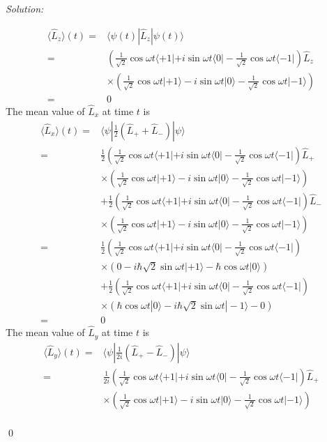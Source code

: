\documentclass[12pt,a4paper]{article}
\newenvironment{sol}
    {\emph{Solution:}
    }
    {
    \qed
    }
\begin{document}
\begin{sol}
\begin{itemize}
\begin{align}
\nonumber\langle\hat{L}_z\rangle(t)=&\langle\psi(t)|\hat{L}_z|\psi(t)\rangle\\
\nonumber=&(\frac{1}{\sqrt{2}}\cos\omega t\langle+1|+i\sin\omega t\langle0|-\frac{1}{\sqrt{2}}\cos\omega t\langle-1|)\hat{L}_z\\
\nonumber&\times(\frac{1}{\sqrt{2}}\cos\omega t|+1\rangle-i\sin\omega t|0\rangle-\frac{1}{\sqrt{2}}\cos\omega t|-1\rangle)\\
=&0
\end{align}
The mean value of $\hat{L}_x$ at time $t$ is
\begin{align}
\nonumber\langle\hat{L}_x\rangle(t)=&\langle\psi|\frac{1}{2}(\hat{L}_++\hat{L}_-)|\psi\rangle\\
\nonumber=&\frac{1}{2}(\frac{1}{\sqrt{2}}\cos\omega t\langle+1|+i\sin\omega t\langle0|-\frac{1}{\sqrt{2}}\cos\omega t\langle-1|)\hat{L}_+\\
\nonumber&\times(\frac{1}{\sqrt{2}}\cos\omega t|+1\rangle-i\sin\omega t|0\rangle-\frac{1}{\sqrt{2}}\cos\omega t|-1\rangle)\\
\nonumber&+\frac{1}{2}(\frac{1}{\sqrt{2}}\cos\omega t\langle+1|+i\sin\omega t\langle0|-\frac{1}{\sqrt{2}}\cos\omega t\langle-1|)\hat{L}_-\\
\nonumber&\times(\frac{1}{\sqrt{2}}\cos\omega t|+1\rangle-i\sin\omega t|0\rangle-\frac{1}{\sqrt{2}}\cos\omega t|-1\rangle)\\
\nonumber=&\frac{1}{2}(\frac{1}{\sqrt{2}}\cos\omega t\langle+1|+i\sin\omega t\langle0|-\frac{1}{\sqrt{2}}\cos\omega t\langle-1|)\\
\nonumber&\times(0-i\hbar\sqrt{2}\sin\omega t|+1\rangle-\hbar\cos\omega t|0\rangle)\\
\nonumber&+\frac{1}{2}(\frac{1}{\sqrt{2}}\cos\omega t\langle+1|+i\sin\omega t\langle0|-\frac{1}{\sqrt{2}}\cos\omega t\langle-1|)\\
\nonumber&\times(\hbar\cos\omega t|0\rangle-i\hbar\sqrt{2}\sin\omega t|-1\rangle-0)\\
=&0
\end{align}
The mean value of $\hat{L}_y$ at time $t$ is
\begin{align}
\nonumber\langle\hat{L}_y\rangle(t)=&\langle\psi|\frac{1}{2i}(\hat{L}_+-\hat{L}_-)|\psi\rangle\\
\nonumber=&\frac{1}{2i}(\frac{1}{\sqrt{2}}\cos\omega t\langle+1|+i\sin\omega t\langle0|-\frac{1}{\sqrt{2}}\cos\omega t\langle-1|)\hat{L}_+\\
\nonumber&\times(\frac{1}{\sqrt{2}}\cos\omega t|+1\rangle-i\sin\omega t|0\rangle-\frac{1}{\sqrt{2}}\cos\omega t|-1\rangle)\\

\end{align}
\end{itemize}
\end{sol}
\end{document}
